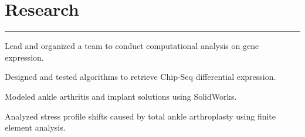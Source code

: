 \documentclass[letterpaper]{deedy-resume} %
\newcommand{\colorrule}[1]{%
\begingroup\color{#1}\hrule\endgroup%
}%
\begin{document}
\sectionspace %
\vspace{1 mm}



\section{Research}

\normalfont
\colorrule{black}
\vspace{2 mm}
\hfill
{}
\hfill
{}
\vspace{1 mm}
\begin{tightitemize}
	\item Lead and organized a team to conduct computational analysis on gene expression.
	\item Designed and tested algorithms to retrieve Chip-Seq differential expression.  	
\end{tightitemize}		
\sectionspace %
\vspace{2 mm}

\hfill
{}
\hfill
{}
\vspace{1 mm}
\begin{tightitemize}
	\item Modeled ankle arthritis and implant solutions using SolidWorks. 
	\item Analyzed stress profile shifts caused by total ankle arthroplasty using finite element analysis. 
 \end{tightitemize}
\end{document}
